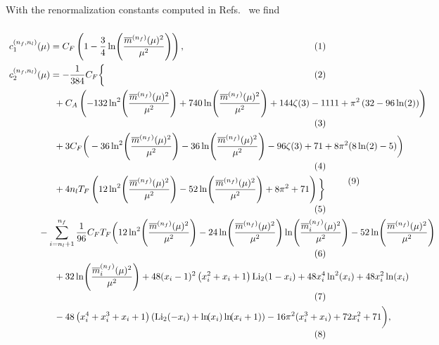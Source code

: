 With the renormalization constants computed in Refs.~\cite{Tarrach:1980up, Gray:1990yh} we find
\begin{equation}
\resizebox{\textwidth}{!}{
\begin{minipage}{\textwidth}
\begin{align*}
c_1^{(n_f, n_l)}(&\mu) = C_F \left(1 -\frac{3}{4} \ln\! \left(\frac{\overline{m}^{(n_f)}(\mu)^2}{\mu^2} \right) \right), \\
c_2^{(n_f, n_l)}(&\mu) = -\frac{1}{384} C_F \bigg \lbrace \\
& \hspace{0.5cm} + C_A \left(-132 \ln^2\!\left(\frac{\overline{m}^{(n_f)}(\mu)^2}{\mu^2} \right) +740 \ln\! \left(\frac{\overline{m}^{(n_f)}(\mu)^2}{\mu^2} \right) +144 \zeta (3)-1111+\pi ^2 \left( 32-96 \ln (2) \right) \right) \\
& \hspace{0.5cm} +3 C_F \bigg(-36 \ln^2\! \left(\frac{\overline{m}^{(n_f)}(\mu)^2}{\mu^2} \right) -36 \ln\! \left(\frac{\overline{m}^{(n_f)}(\mu)^2}{\mu^2} \right) -96 \zeta (3)+71+8 \pi ^2 (8 \ln (2)-5)\bigg) \\
& \hspace{0.5cm} +4 n_l T_F\left(12 \ln^2\! \left( \frac{\overline{m}^{(n_f)}(\mu)^2}{\mu^2} \right) -52 \ln\! \left( \frac{\overline{m}^{(n_f)}(\mu)^2}{\mu^2} \right) +8 \pi ^2+71\right) \bigg  \rbrace \\
& \hspace{-0.1cm}  -  \sum_{i = n_l + 1}^{n_f} \frac{1}{96} C_F T_F \bigg(12 \ln^2\! \left( \frac{\overline{m}^{(n_f)}(\mu)^2}{\mu^2} \right) -24 \ln\! \left(\frac{\overline{m}^{(n_f)}(\mu)^2}{\mu^2} \right) \ln\! \left( \frac{\overline{m}^{(n_f)}_i(\mu)^2}{\mu^2} \right) -52 \ln\! \left(\frac{\overline{m}^{(n_f)}(\mu)^2}{\mu^2} \right) \\
& \hspace{0.5cm} +32 \ln\!\left( \frac{\overline{m}^{(n_f)}_i(\mu)^2}{\mu^2} \right) +48 (x_i-1)^2 \left(x_i^2+x_i+1\right) \text{Li}_2(1-x_i)  + 48 x_i^4 \ln ^2(x_i) + 48 x_i^2 \ln (x_i)\\
& \hspace{0.5cm} -48 \left(x_i^4+x_i^3+x_i+1\right) \left(\text{Li}_2(-x_i) + \ln\!(x_i) \ln\!(x_i + 1) \right)  - 16 \pi^2 (x_i^3 + x_i) +72 x_i^2 +71\bigg),
\end{align*}
\end{minipage}
}
\refstepcounter{equation}
\tag{\theequation} \label{eq:5:c1_c2_full}
\end{equation}
